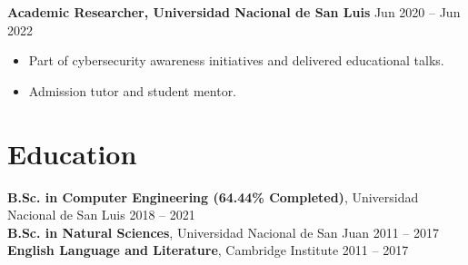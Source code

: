 \documentclass[10pt, letterpaper]{article}
\begin{document}
\textbf{Academic Researcher, Universidad Nacional de San Luis} \hfill Jun 2020 – Jun 2022 \
\begin{itemize}[leftmargin=10pt, noitemsep]
    \item Part of cybersecurity awareness initiatives and delivered educational talks.
    \item Admission tutor and student mentor.
\end{itemize}

\section{Education}
\textbf{B.Sc. in Computer Engineering (64.44\% Completed)}, Universidad Nacional de San Luis \hfill 2018 – 2021 \\
\textbf{B.Sc. in Natural Sciences}, Universidad Nacional de San Juan \hfill 2011 – 2017 \\
\textbf{English Language and Literature}, Cambridge Institute \hfill 2011 – 2017


\end{document}
